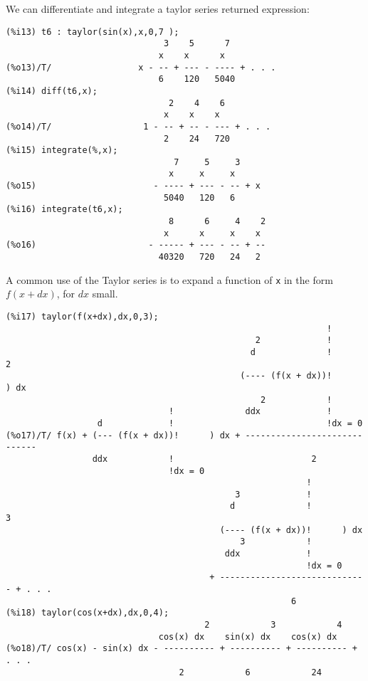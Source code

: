 \documentclass[12pt]{article}
\begin{document}
\smallskip
We can differentiate and integrate a taylor series returned expression:
\small
\begin{verbatim}
(%i13) t6 : taylor(sin(x),x,0,7 );
                               3    5      7
                              x    x      x
(%o13)/T/                 x - -- + --- - ---- + . . .
                              6    120   5040
(%i14) diff(t6,x);
                                2    4    6
                               x    x    x
(%o14)/T/                  1 - -- + -- - --- + . . .
                               2    24   720
(%i15) integrate(%,x);
                                 7     5     3
                                x     x     x
(%o15)                       - ---- + --- - -- + x
                               5040   120   6
(%i16) integrate(t6,x);
                                8      6     4    2
                               x      x     x    x
(%o16)                      - ----- + --- - -- + --
                              40320   720   24   2
\end{verbatim}
\normalsize
A common use of the Taylor series is to expand a function of \verb|x| in the form
  $f(x + dx)$, for $dx$ small.
\small
\begin{verbatim}
(%i17) taylor(f(x+dx),dx,0,3);
                                                               !
                                                 2             !
                                                d              !          2
                                              (---- (f(x + dx))!      ) dx
                                                  2            !
                                !              ddx             !
                  d             !                              !dx = 0
(%o17)/T/ f(x) + (--- (f(x + dx))!      ) dx + -----------------------------
                 ddx            !                           2
                                !dx = 0
                                                           !
                                             3             !
                                            d              !          3
                                          (---- (f(x + dx))!      ) dx
                                              3            !
                                           ddx             !
                                                           !dx = 0
                                        + ----------------------------- + . . .
                                                        6
(%i18) taylor(cos(x+dx),dx,0,4);
                                       2            3            4
                              cos(x) dx    sin(x) dx    cos(x) dx
(%o18)/T/ cos(x) - sin(x) dx - ---------- + ---------- + ---------- + . . .
                                  2            6            24
\end{verbatim}
\normalsize
  
\end{document}
